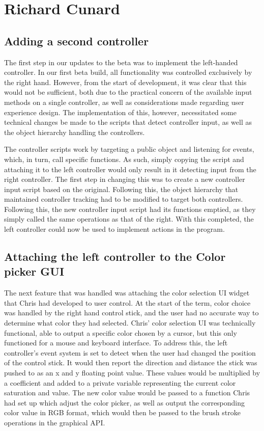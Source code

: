 \documentclass[onecolumn, draftclsnofoot,10pt, compsoc]{IEEEtran}
\begin{document}
\section{Richard Cunard}

\subsection{Adding a second controller}

The first step in our updates to the beta was to implement the left-handed controller. In our first beta build, all functionality was controlled exclusively by the right hand. However, from the start of development, it was clear that this would not be sufficient, both due to the practical concern of the available input methods on a single controller, as well as considerations made regarding user experience design. The implementation of this, however, necessitated some technical changes be made to the scripts that detect controller input, as well as the object hierarchy handling the controllers. 

The controller scripts work by targeting a public object and listening for events, which, in turn, call specific functions. As such, simply copying the script and attaching it to the left controller would only result in it detecting input from the right controller. The first step in changing this was to create a new controller input script based on the original. Following this, the object hierarchy that maintained controller tracking had to be modified to target both controllers. Following this, the new controller input script had its functions emptied, as they simply called the same operations as that of the right. With this completed, the left controller could now be used to implement actions in the program.


\subsection{Attaching the left controller to the Color picker GUI}

The next feature that was handled was attaching the color selection UI widget that Chris had developed to user control. At the start of the term, color choice was handled by the right hand control stick, and the user had no accurate way to determine what color they had selected. Chris’ color selection UI was technically functional, able to output a specific color chosen by a cursor, but this only functioned for a mouse and keyboard interface. To address this, the left controller’s event system is set to detect when the user had changed the position of the control stick. It would then report the direction and distance the stick was pushed to as an x and y floating point value. These values would be multiplied by a coefficient and added to a private variable representing the current color saturation and value. The new color value would be passed to a function Chris had set up which adjust the color picker, as well as output the corresponding color value in RGB format, which would then be passed to the brush stroke operations in the graphical API. 
\end{document}
